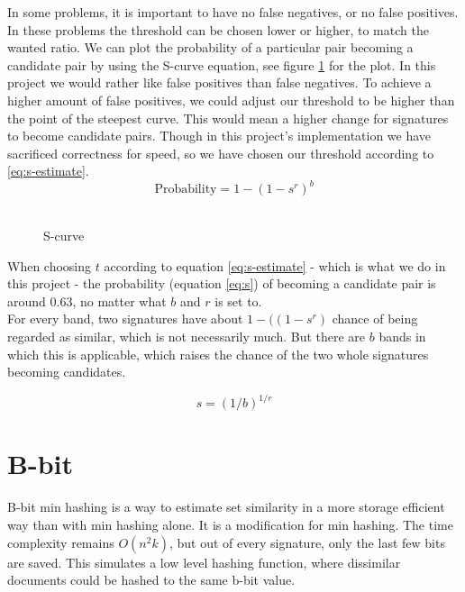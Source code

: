 \documentclass[a4paper,11pt]{article}
\begin{document}
In some problems, it is important to have no false negatives, or no false positives. In these problems the threshold can be chosen lower or higher, to match the wanted ratio. We can plot the probability of a particular pair becoming a candidate pair by using the S-curve equation, see figure \ref{fig:scurve} for the plot. In this project we would rather like false positives than false negatives. To achieve a higher amount of false positives, we could adjust our threshold to be higher than the point of the steepest curve. This would mean a higher change for signatures to become candidate pairs. Though in this project's implementation we have sacrificed correctness for speed, so we have chosen our threshold according to \ref{eq:s-estimate}. \\

\begin{equation}
    \text {Probability} = 1 - (1 - s^r)^b 
    \label{eq:s}
\end{equation}\\

\begin{figure}[!htpb]
    \begin{center}
        
        \caption{S-curve}
        \label{fig:scurve}
    \end{center}
\end{figure}

When choosing $t$ according to equation \ref{eq:s-estimate} - which is what we do in this project - the probability (equation \ref{eq:s}) of becoming a candidate pair is around $0.63$, no matter what $b$ and $r$ is set to. \\

For every band, two signatures have about $1 - (\left(1-s^r \right)$ chance of being regarded as similar, which is not necessarily much. But there are $b$ bands in which this is applicable, which raises the chance of the two whole signatures becoming candidates.

\begin{equation}
    s = (1/b)^{1/r}
    \label{eq:s-estimate}
\end{equation}


\section{B-bit}
B-bit min hashing is a way to estimate set similarity in a more storage efficient way than with min hashing alone. It is a modification for min hashing. The time complexity remains $O(n^2k)$, but out of every signature, only the last few bits are saved. This simulates a low level hashing function, where dissimilar documents could be hashed to the same b-bit value. \\
\end{document}
